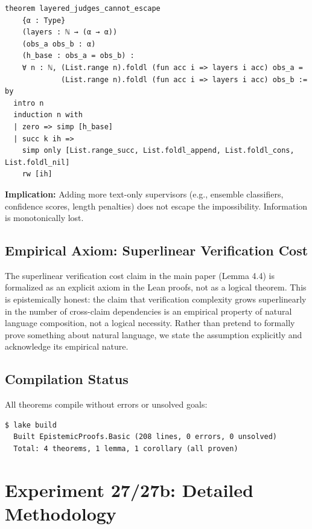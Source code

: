 \documentclass[12pt]{article}
\begin{document}
\begin{lstlisting}[caption=Layered Judges Cannot Escape (Lean), label=lst:lean-layered]
theorem layered_judges_cannot_escape
    {α : Type}
    (layers : ℕ → (α → α))
    (obs_a obs_b : α)
    (h_base : obs_a = obs_b) :
    ∀ n : ℕ, (List.range n).foldl (fun acc i => layers i acc) obs_a =
             (List.range n).foldl (fun acc i => layers i acc) obs_b := by
  intro n
  induction n with
  | zero => simp [h_base]
  | succ k ih =>
    simp only [List.range_succ, List.foldl_append, List.foldl_cons, List.foldl_nil]
    rw [ih]
\end{lstlisting}

\textbf{Implication:} Adding more text-only supervisors (e.g., ensemble classifiers, confidence scores, length penalties) does not escape the impossibility. Information is monotonically lost.

\subsection{Empirical Axiom: Superlinear Verification Cost}

The superlinear verification cost claim in the main paper (Lemma 4.4) is formalized as an explicit axiom in the Lean proofs, not as a logical theorem. This is epistemically honest: the claim that verification complexity grows superlinearly in the number of cross-claim dependencies is an empirical property of natural language composition, not a logical necessity. Rather than pretend to formally prove something about natural language, we state the assumption explicitly and acknowledge its empirical nature.

\subsection{Compilation Status}

All theorems compile without errors or unsolved goals:
\begin{verbatim}
$ lake build
  Built EpistemicProofs.Basic (208 lines, 0 errors, 0 unsolved)
  Total: 4 theorems, 1 lemma, 1 corollary (all proven)
\end{verbatim}


\section{Experiment 27/27b: Detailed Methodology}
\end{document}
